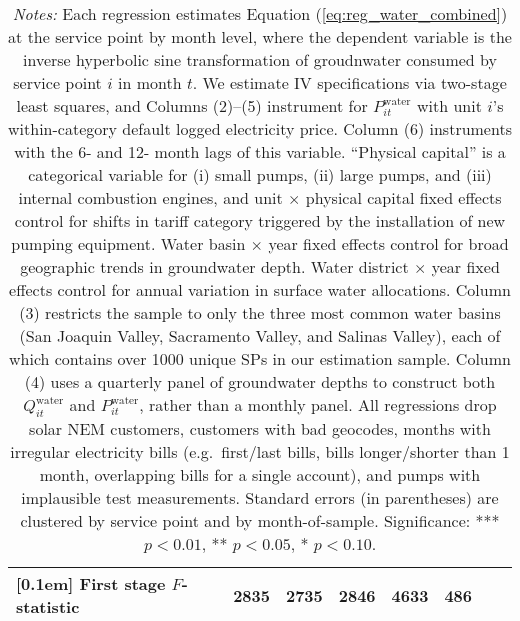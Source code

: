 \begin{table}[t!]
\begin{adjustbox}{center}
\begin{tabular}{lcccccccc}
[0.1em] 
First stage $F$-statistic &  & 2835 & 2735 & 2846 & 4633 & 486 \\ 
[0.15em]
\hline
\end{tabular}
\end{adjustbox}
\captionsetup{width=\textwidth}
\caption*{\scriptsize \emph{Notes:} 
Each regression estimates Equation (\ref{eq:reg_water_combined}) at the service point by month level,
where the dependent variable is the inverse hyperbolic sine transformation 
of groudnwater consumed by service point $i$ in month $t$.
We estimate IV specifications via two-stage least squares, and Columns (2)--(5) instrument  
for $P^{\text{water}}_{it}$ with unit $i$'s within-category default logged electricity price. 
Column (6) instruments with the 6- and 12- month lags of this variable.
``Physical capital'' is a categorical variable for (i) small pumps, (ii) large pumps, and (iii) 
internal combustion engines, and unit $\times$ physical capital fixed effects control for shifts 
in tariff category triggered by the installation of new pumping equipment.
Water basin $\times$ year fixed effects control for broad geographic trends in groundwater depth.
Water district $\times$ year fixed effects control for annual variation in surface water allocations.
Column (3) restricts the sample to only the three most common water basins (San Joaquin Valley, 
Sacramento Valley, and Salinas Valley), each of which contains over 1000 unique SPs in our estimation sample.
Column (4) uses a quarterly panel of groundwater depths to construct both $Q^{\text{water}}_{it}$ and $P^{\text{water}}_{it}$, 
rather than a monthly panel.
All regressions drop solar NEM customers, customers with bad geocodes, months with irregular electricity bills 
(e.g.\ first/last bills, bills longer/shorter than 1 month, overlapping bills for a single account),
and pumps with implausible test measurements.
Standard errors (in parentheses) are clustered by service point and by month-of-sample.
Significance: *** $p < 0.01$, ** $p < 0.05$, * $p < 0.10$.
}
\end{table}
